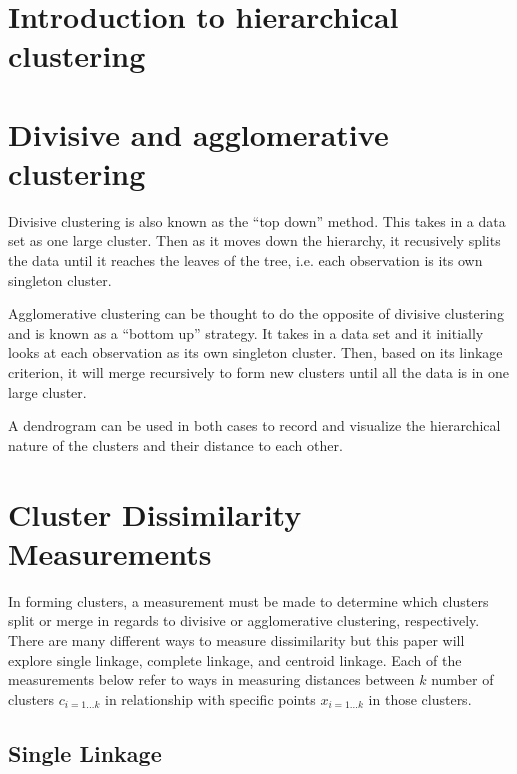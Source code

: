 \documentclass[../tech_report_1.tex]{subfiles}
\begin{document}
\section{Introduction to hierarchical clustering}


\section{Divisive and agglomerative clustering}


Divisive clustering is also known as the ``top down'' method. This takes
in a data set as one large cluster. Then as it moves down the hierarchy,
it recusively splits the data until it reaches the leaves of the tree, i.e. each
observation is its own singleton cluster.

Agglomerative clustering can be thought to do the opposite of divisive
clustering and is known as a ``bottom up'' strategy. It takes in
a data set and it initially looks at each observation as its own singleton
cluster. Then, based on its linkage criterion, it will merge recursively
to form new clusters until all the data is in one large cluster.

A dendrogram can be used in both cases to record and visualize the hierarchical nature of the
clusters and their distance to each other.



\section{Cluster Dissimilarity Measurements}


In forming clusters, a measurement must be made to determine which
clusters split or merge in regards to divisive or agglomerative clustering,
respectively. There are many different ways to measure dissimilarity
but this paper will explore single linkage, complete linkage, and
centroid linkage. Each of the measurements below refer to ways in
measuring distances between $k$ number of clusters $c_{i=1\dots k}$
in relationship with specific points $x_{i=1\dots k}$ in those clusters.


\subsection{Single Linkage}
\end{document}
